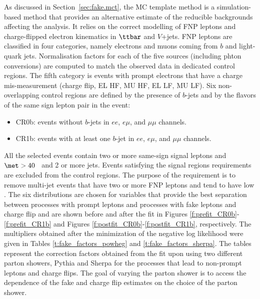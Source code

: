 As discussed in Section~\ref{sec:fake.mct}, the MC template method is
 a simulation-based method that provides an alternative estimate of the reducible backgrounds affecting the analysis.
It relies on the correct modelling of FNP leptons and charge-flipped electron kinematics in $\ttbar$ 
and $V$+jets.
FNP leptons are classified in four categories, namely electrons and muons coming 
from $b$ and light-quark jets. Normalisation factors for each of the five sources (including phton conversions) are computed to match the observed data 
in dedicated control regions. The fifth category is events with prompt electrons that have a charge mis-measurement 
(charge flip, EL HF, MU HF, EL LF, MU LF).
Six non-overlapping control regions are defined by the presence of $b$-jets and by the flavors of the same sign lepton pair in the event:
\begin{itemize}
\item CR0b: events without $b$-jets in $ee$, $e\mu$, and $\mu\mu$ channels.
\item CR1b: events with at least one $b$-jet in $ee$, $e\mu$, and $\mu\mu$ channels.
\end{itemize}
All the selected events contain two or more same-sign signal leptons and $\met >40$ \GeV~and 2 or more jets. 
Events satisfying the signal regions requirements are excluded from the control regions. 
The purpose of the \met requirement is to remove multi-jet events that have two or more FNP leptons and tend to have low \met. 
The six distributions are chosen for variables that provide the best separation between processes with prompt leptons and processes with 
fake leptons and charge flip and are shown 
before and after the fit in Figures \ref{f:prefit_CR0b}-\ref{f:prefit_CR1b} and Figures \ref{f:postfit_CR0b}-\ref{f:postfit_CR1b}, 
respectively. 
The multipliers obtained after the minimization of the negative log likelihood were given 
in Tables \ref{t:fake_factors_powheg} and \ref{t:fake_factors_sherpa}.
The tables represent the correction factors obtained from the fit upon using two different parton showers, Pythia and Sherpa
for the processes that lead to non-prompt leptons and charge flips.
The goal of varying the parton shower is to access the dependence of the fake and charge flip estimates on the choice of the 
parton shower. 

